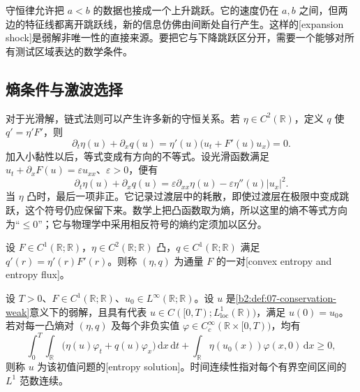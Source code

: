 守恒律允许把 \(a<b\) 的数据也接成一个上升跳跃。它的速度仍在 \(a,b\) 之间，但两边的特征线都离开跳跃线，新的信息仿佛由间断处自行产生。这样的[expansion shock]是弱解非唯一性的直接来源。要把它与下降跳跃区分开，需要一个能够对所有测试区域表达的数学条件。

\subsection{熵条件与激波选择}
\label{b2:subsec:070503}

对于光滑解，链式法则可以产生许多新的守恒关系。若 \(\eta\in C^2(\mathbb R)\)，定义 \(q\) 使 \(q'=\eta'F'\)，则
\[
 \partial_t\eta(u)+\partial_xq(u)
 =\eta'(u)\bigl(u_t+F'(u)u_x\bigr)=0.
\]
加入小黏性以后，等式变成有方向的不等式。设光滑函数满足
\(u_t+\partial_xF(u)=\varepsilon u_{xx}\)、\(\varepsilon>0\)，便有
\begin{equation}\label{b2:eq:07-viscous-entropy}
 \partial_t\eta(u)+\partial_xq(u)
 =\varepsilon\partial_{xx}\eta(u)
   -\varepsilon\eta''(u)|u_x|^2.
\end{equation}
当 \(\eta\) 凸时，最后一项非正。它记录过渡层中的耗散，即使过渡层在极限中变成跳跃，这个符号仍应保留下来。数学上把凸函数取为熵，所以这里的熵不等式方向为“\(\leq0\)”；它与物理学中采用相反符号的熵约定须加以区分。

\begin{definition}\label{b2:def:07-entropy-pair}
设 \(F\in C^1(\mathbb R;\mathbb R)\)，\(\eta\in C^2(\mathbb R;\mathbb R)\) 凸，\(q\in C^1(\mathbb R;\mathbb R)\) 满足 \(q'(r)=\eta'(r)F'(r)\)。则称 \((\eta,q)\) 为通量 \(F\) 的一对[convex entropy and entropy flux]。
\end{definition}

\begin{definition}\label{b2:def:07-entropy-solution}
设 \(T>0\)、\(F\in C^1(\mathbb R;\mathbb R)\)、\(u_0\in L^\infty(\mathbb R;\mathbb R)\)。设 \(u\) 是\cref{b2:def:07-conservation-weak}意义下的弱解，且具有代表
\(u\in C([0,T);L^1_{\mathrm{loc}}(\mathbb R))\)，满足 \(u(0)=u_0\)。若对每一凸熵对 \((\eta,q)\) 及每个非负实值 \(\varphi\in C_c^\infty(\mathbb R\times[0,T))\)，均有
\begin{equation}\label{b2:eq:07-entropy-integral}
 \int_0^T\!\int_{\mathbb R}
 \bigl(\eta(u)\varphi_t+q(u)\varphi_x\bigr)\,\mathrm dx\,\mathrm dt
 +\int_{\mathbb R}\eta(u_0(x))\varphi(x,0)\,\mathrm dx\geq0,
\end{equation}
则称 \(u\) 为该初值问题的[entropy solution]。时间连续性指对每个有界空间区间的 \(L^1\) 范数连续。
\end{definition}

